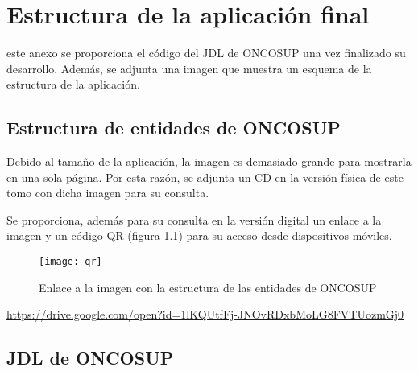 \chapter{Estructura de la aplicación final}
\label{anex:1}

 este anexo se proporciona el código del JDL de ONCOSUP una vez finalizado su desarrollo. Además, se adjunta una imagen que muestra un esquema de la estructura de la aplicación.

\section{Estructura de entidades de ONCOSUP}

Debido al tamaño de la aplicación, la imagen es demasiado grande para mostrarla en una sola página. Por esta razón, se adjunta un CD en la versión física de este tomo con dicha imagen para su consulta.

Se proporciona, además para su consulta en la versión digital un enlace a la imagen y un código QR (figura \ref{fig:qr}) para su acceso desde dispositivos móviles.

\begin{figure}[!h]
\begin{center}
\texttt{[image: qr]}
\caption{Enlace a la imagen con la estructura de las entidades de ONCOSUP}
\label{fig:qr}
\end{center}
\end{figure}

\url{https://drive.google.com/open?id=1lKQUtfFj-JNOvRDxbMoLG8FVTUozmGj0}

\clearpage
\section{JDL de ONCOSUP}




